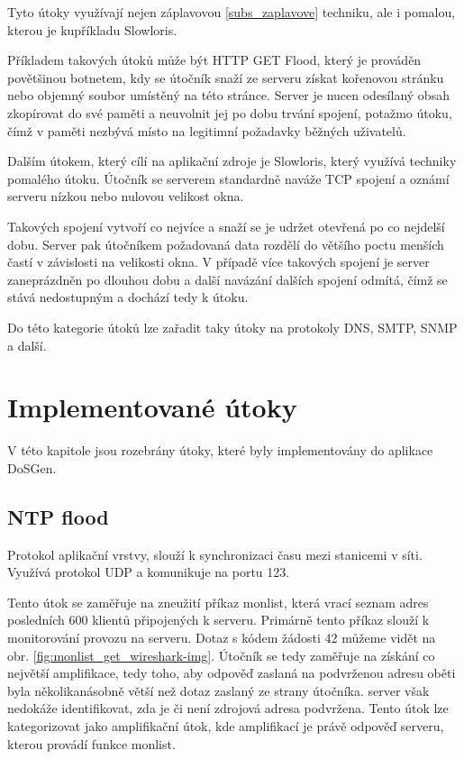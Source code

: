Tyto útoky využívají nejen záplavovou \ref{subs_zaplavove} techniku, ale i pomalou, kterou je
kupříkladu Slowloris.
 
Příkladem takových útoků může být HTTP GET Flood, který je prováděn povětšinou botnetem, kdy
se útočník snaží ze serveru získat kořenovou stránku nebo objemný soubor umístěný na této
stránce. Server je nucen odesílaný obsah zkopírovat do své paměti a neuvolnit jej po dobu
trvání spojení, potažmo útoku, čímž v paměti nezbývá místo na legitimní požadavky běžných
uživatelů.

Dalším útokem, který cílí na aplikační zdroje je Slowloris, který využívá techniky pomalého
útoku. Útočník se serverem standardně naváže TCP spojení a oznámí serveru nízkou nebo nulovou
velikost okna.

Takových spojení vytvoří co nejvíce a snaží se je udržet otevřená po co nejdelší dobu.
Server pak útočníkem požadovaná data rozdělí do většího poctu menších častí v závislosti na
velikosti okna. V případě více takových spojení je server zaneprázdněn po dlouhou dobu a
další navázání dalších spojení odmítá, čímž se stává nedostupným a dochází tedy k 
útoku.

Do této kategorie útoků lze zařadit taky útoky na protokoly DNS, SMTP, SNMP a další.

\section{Implementované útoky}
V této kapitole jsou rozebrány útoky, které byly implementovány do aplikace DoSGen.

\subsection{NTP flood}
Protokol aplikační vrstvy,  slouží k synchronizaci času mezi stanicemi v síti.
Využívá protokol UDP a komunikuje na portu 123.

Tento útok se zaměřuje na zneužití příkaz monlist, která vrací seznam  adres
posledních 600 klientů připojených k  serveru. Primárně tento příkaz slouží k
monitorování provozu na serveru. Dotaz s kódem žádosti 42   můžeme vidět
na obr.  \ref{fig:monlist_get_wireshark-img}. Útočník se tedy zaměřuje na získání co
největší amplifikace, tedy toho, aby odpověď zaslaná na podvrženou  adresu oběti
byla několikanásobně větší než dotaz zaslaný ze strany útočníka.  server však
nedokáže identifikovat, zda je či není zdrojová adresa podvržena.
Tento útok lze kategorizovat jako amplifikační útok, kde amplifikací je právě odpověď
 serveru, kterou provádí funkce monlist.

